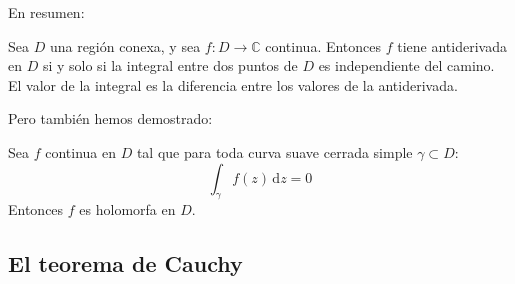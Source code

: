   En resumen:
  \begin{theorem}
    \label{theo:complex-integral=antiderivative}
    Sea \(D\) una región conexa,
    y sea \(f \colon D \rightarrow \mathbb{C}\) continua.
    Entonces \(f\) tiene antiderivada en \(D\) si y solo si
    la integral entre dos puntos de \(D\)
    es independiente del camino.
    El valor de la integral es la diferencia
    entre los valores de la antiderivada.
  \end{theorem}
  Pero también hemos demostrado:
  \begin{theorem}[Morera]
    \label{theo:Morera}
    Sea \(f\) continua en \(D\) tal que
    para toda curva suave cerrada simple \(\gamma \subset D\):
    \begin{equation*}
      \int_\gamma f(z) \, \mathrm{d} z
	= 0
    \end{equation*}
    Entonces \(f\) es holomorfa en \(D\).
  \end{theorem}

\subsection{El teorema de Cauchy}
\label{sec:Cauchy-theorem}


